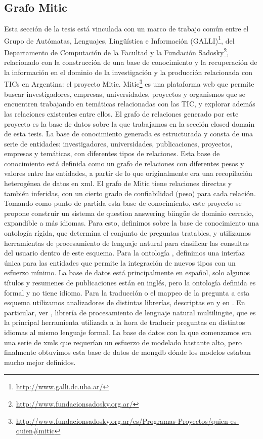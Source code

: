 \subsection{Grafo Mitic}
\label{subsec:mitic}

Esta sección de la tesis está vinculada con un marco de trabajo común entre el
Grupo de Autómatas, Lenguajes, Lingüística e Información (GALLI)\footnote{\url{http://www.galli.dc.uba.ar/}}, 
del Departamento de Computación de la Facultad y la Fundación Sadosky\footnote{\url{http://www.fundacionsadosky.org.ar/}}, relacionado con la construcción de una base de conocimiento
 y la recuperación de la información en el dominio de la investigación y la
producción relacionada con TICs en Argentina: el proyecto Mitic.
Mitic\footnote{\url{http://www.fundacionsadosky.org.ar/es/Programas-Proyectos/quien-es-quien\#mitic}} es una plataforma web que permite buscar investigadores, empresas, universidades, proyectos y organismos que se encuentren trabajando en temáticas relacionadas con las TIC, y explorar además las relaciones existentes entre ellos. El grafo de relaciones generado por este proyecto es la base de datos sobre la que trabajamos en la sección closed domain de esta tesis.
La base de conocimiento generada es estructurada y consta de
una serie de entidades: investigadores, universidades, publicaciones,
proyectos, empresas y temáticas, con diferentes tipos de relaciones.
Esta base de conocimiento está definida como un grafo de relaciones con diferentes pesos y valores entre
las entidades, a partir de lo que originalmente era una
recopilación heterogénea de datos en xml. El grafo de Mitic
tiene relaciones directas y también inferidas, con un cierto grado
de confiabilidad (peso) para cada relación. Tomando como punto de
partida esta base de conocimiento, este proyecto se propone construir
un sistema de question answering biingüe de dominio cerrado, expandible a más idiomas.
Para esto, definimos sobre la base de conocimiento una ontología
rígida, que determina el conjunto de preguntas tratables, y
utilizamos herramientas de procesamiento de lenguaje natural para
clasificar las consultas del usuario dentro de este esquema. Para la
ontología , definimos una interfaz única para las entidades que
permite la integración de nuevos tipos con un esfuerzo mínimo. 
La base de datos está principalmente en español, solo algunos títulos y resumenes de publicaciones están en inglés,
pero la ontología definida es formal y no tiene idioma. 
Para la traducción o el mappeo de la pregunta a esta esquema utilizamos 
analizadores de distintas librerías, descriptas en  y en .
En particular, ver , librería de procesamiento de lenguaje natural multilingüe, que
es la principal herramienta utilizada a la hora de traducir preguntas en distintos idiomas al mismo lenguaje formal.
La base de datos con la que comenzamos era una serie de xmls que requerían un esfuerzo de modelado bastante alto,
pero finalmente obtuvimos esta base de datos de mongdb dónde los modelos estaban mucho mejor definidos.

